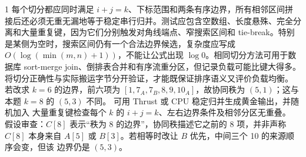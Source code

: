 \begin{solutionexercise}{1}
每个切分都应同时满足 $i+j=k$、下标范围和两条有序边界，所有相邻区间拼接后还必须无重无漏地等于稳定串行归并。测试应包含空数组、长度悬殊、完全分离和大量重复键，因为它们分别触发对角线端点、窄搜索区间和 tie-break。特别是某侧为空时，搜索区间仍有一个合法边界候选，复杂度应写成 $O(\log(\min(m,n)+1))$，不能让公式出现 $\log0$。相同切分方法可用于数据库 sort-merge join、倒排表合并和有序流重分区，但记录负载可能比键大得多。将切分正确性与实际搬运字节分开验证，才能既保证排序语义又评价负载均衡。
\variantheading 若改求 $k=6$ 的边界，前六项为 $[1,7_A,7_B,8,9,10_A]$，故协同秩为
$\boxed{(5,1)}$；这与本题 $k=8$ 的 $(5,3)$ 不同。
\practiceheading 可用 Thrust  或 CPU 稳定归并生成黄金输出，并随机加入
大量重复键检查每个 $k$ 的 $i+j=k$、左右边界条件及相邻分区无重叠。
假设审查：$C[8]$ 表示“秩为 8 的边界”，协同秩描述它之前的 8 项，并非声称 $C[8]$
本身来自 $A[5]$ 或 $B[3]$。若相等时改让 $B$ 优先，中间三个 10 的来源顺序会变，但该
边界仍是 $(5,3)$。
\end{solutionexercise}

